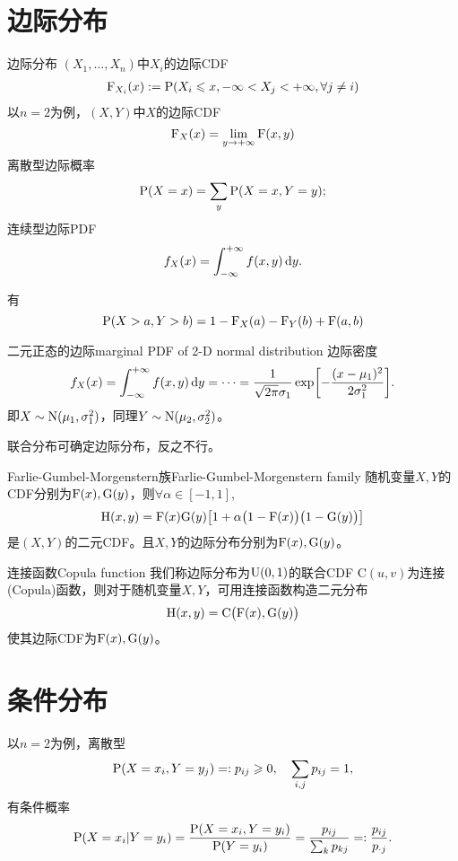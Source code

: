 \section{边际分布}

\begin{definition}{边际分布}{}
	$(X_1,\ldots,X_n)$中$X_i$的边际CDF
	\begin{align}
		\CDF_{X_i}(x):=\P(X_i\leqslant x,-\infty<X_j<+\infty,\forall j\neq i)
	\end{align}
	以$n=2$为例，$(X,Y)$中$X$的边际CDF
	\[
		\CDF_X(x)=\lim_{y\to+\infty}\CDF(x,y)
	\]
	离散型边际概率
	\[
		\P(X=x)=\sum_y\P(X=x,Y=y);
	\]
	连续型边际PDF
	\[
		f_X(x)=\int\iti f(x,y)\d y.
	\]
\end{definition}
有 
\[
	\P(X>a,Y>b)=1-\CDF_X(a)-\CDF_Y(b)+\CDF(a,b)
\]
\begin{example}{二元正态的边际}{marginal PDF of 2-D normal distribution}
	边际密度
	\[
		f_X(x)=\int\iti f(x,y)\d y=\cdots=\frac1{\sqrt{2\pi}\sigma_1}\exp\biggfkh{-\frac{(x-\mu_1)^2}{2\sigma_1^2}}.
	\]
	即$X\sim\Norm(\mu_1,\sigma_1^2)$，同理$Y\sim\Norm(\mu_2,\sigma_2^2)$。
\end{example}
联合分布可确定边际分布，反之不行。
\begin{example}{Farlie-Gumbel-Morgenstern族}{Farlie-Gumbel-Morgenstern family}
	随机变量$X,Y$的CDF分别为$\CDF(x),\mathrm G(y)$，则$\forall\alpha\in[-1,1],$
	\begin{align}
		\mathrm H(x,y)=\CDF(x)\mathrm G(y)\bigfkh{1+\alpha\bigkh{1-\CDF(x)}\bigkh{1-\mathrm G(y)}}
	\end{align}
	是$(X,Y)$的二元CDF。且$X,Y$的边际分布分别为$\CDF(x),\mathrm G(y)$。
\end{example}
\begin{example}{连接函数}{Copula function}
	我们称边际分布为$\Unif(0,1)$的联合CDF $\mathrm C(u,v)$为连接(Copula)函数，则对于随机变量$X,Y$，可用连接函数构造二元分布
	\begin{align}
		\mathrm H(x,y)=\mathrm C\bigkh{\CDF(x),\mathrm G(y)}
	\end{align}
	使其边际CDF为$\CDF(x),\mathrm G(y)$。
\end{example}
\section{条件分布}
以$n=2$为例，离散型
\[
	\P(X=x_i,Y=y_j)=:p_{ij}\geqslant 0,\quad\sum_{i,j}p_{ij}=1,
\]
有条件概率
\begin{align}
	\P(X=x_i|Y=y_i)=\frac{\P(X=x_i,Y=y_i)}{\P(Y=y_i)}=\frac{p_{ij}}{\sum_kp_{kj}}=:\frac{p_{ij}}{p_{\cdot j}}.
\end{align}

